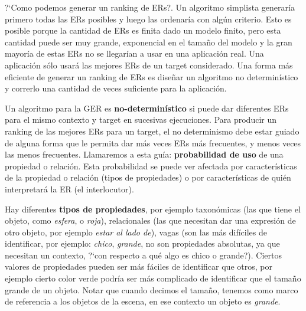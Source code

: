 ?`Como podemos generar un ranking de ERs?.
Un algoritmo simplista generar\'ia primero todas las ERs posibles y luego las ordenar\'ia con alg\'un criterio. Esto es posible porque la cantidad de ERs es finita dado un modelo finito, pero esta cantidad puede ser muy grande, exponencial en el tama\~{n}o del modelo y la gran mayor\'ia de estas ERs no se llegar\'ian a usar en una aplicaci\'on real. Una aplicaci\'on s\'olo usar\'a las mejores ERs de un target considerado.
Una forma m\'as eficiente de generar un ranking de ERs es dise\~{n}ar un algoritmo no determin\'istico y correrlo una cantidad de veces suficiente para la aplicaci\'on.

Un algoritmo para la GER es {\bf no-determin\'istico} si puede dar diferentes ERs para el mismo contexto y target en sucesivas ejecuciones. 
Para producir un ranking de las mejores ERs para un target, el no determinismo debe estar guiado de alguna forma que le permita dar m\'as veces ERs m\'as frecuentes, y menos veces las menos frecuentes. Llamaremos a esta gu\'ia: \textbf{probabilidad de uso} de una propiedad o relaci\'on. Esta probabilidad se puede ver afectada por caracter\'isticas de la propiedad o relaci\'on (tipos de propiedades) o por caracter\'isticas de qui\'en interpretar\'a la ER (el interlocutor).

Hay diferentes \textbf{tipos de propiedades}, por ejemplo taxon\'omicas (las que tiene el objeto, como \emph{esfera}, o \emph{roja}), relacionales (las que necesitan dar una expresi\'on de otro objeto, por ejemplo {\it estar al lado de}), vagas (son las m\'as dif\'iciles de identificar, por ejemplo: \emph{chico}, \emph{grande}, no son propiedades absolutas, ya que necesitan un contexto, ?`con respecto a qu\'e algo es chico o grande?). Ciertos valores de propiedades pueden ser m\'as f\'aciles de identificar que otros, por ejemplo cierto color verde podr\'{i}a ser m\'as complicado de identificar que el tama\~no grande de un objeto. Notar que cuando decimos el tama\~no, tenemos como marco de referencia a los objetos de la escena, en ese contexto un objeto es {\it grande}.

